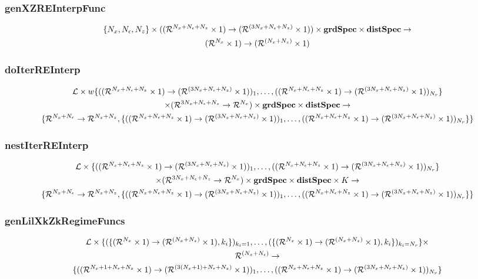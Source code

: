 \documentclass[tikz]{beamer}
\begin{document}
\begin{frame}
\frametitle{genXZREInterpFunc}
\label{sec:genfpfunc}
\begin{gather*}
\{\numX,\numEps,\numZ\}\times(\xzFuncGuessSig)\times \grdSpec \times  \dstSpec   \rightarrow\\
\bigXFuncSig
\end{gather*}



\end{frame}
\begin{frame}
\frametitle{doIterREInterp}
\label{sec:doiterreinterp}

\begin{gather*}
  \linMod \times 
w\{(\xzFuncGuessSig)_1,\ldots,(\xzFuncGuessSig)_{\numR}\}  \\
 \times (\eqnFuncSig ) \times \grdSpec \times \dstSpec \rightarrow\\
\{\frfpnsFuncSig, \{(\xzFuncGuessSig)_1,\ldots,(\xzFuncGuessSig)_{\numR}\}\}
\end{gather*}



\end{frame}
\begin{frame}
\frametitle{nestIterREInterp}
\label{sec:nestiterreinterp}



\begin{gather*}
  \linMod \times 
\{(\xzFuncGuessSig)_1,\ldots,(\xzFuncGuessSig)_{\numR}\}  \\
 \times (\eqnFuncSig ) \times \grdSpec \times \dstSpec \times \numIters \rightarrow\\
\{\frfpnsFuncSig, \{(\xzFuncGuessSig)_1,\ldots,(\xzFuncGuessSig)_{\numR}\}\}
\end{gather*}



\end{frame}
\begin{frame}
\frametitle{genLilXkZkRegimeFuncs}
\label{sec:genlilxkzkregimefunc}
{\small
\begin{gather*}
\linMod \times \{(\{  \bigXFuncSig, k_i \})_{k_i=1},\ldots,(\{  \bigXFuncSig, k_i \})_{k_i=\numR}\} \times\\ \Rn{(\numX+\numEps)} \rightarrow\\
\{(\lilXRegimeFuncSig)_1,\ldots,(\xzFuncGuessSig)_{\numR}\}
\end{gather*}
}





\end{frame}
\end{document}
